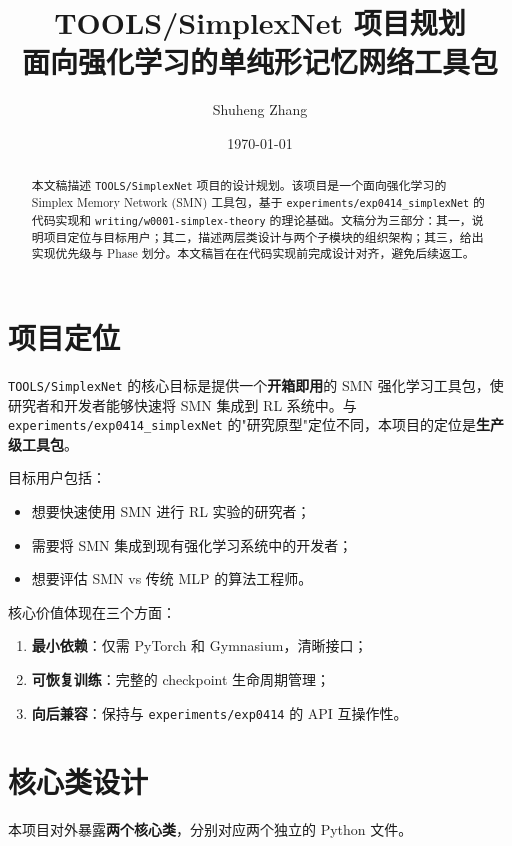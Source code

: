 \documentclass[11pt]{ctexart}
\title{TOOLS/SimplexNet 项目规划\\\large 面向强化学习的单纯形记忆网络工具包}
\author{Shuheng Zhang}
\date{\today}
\begin{document}
\maketitle

\begin{abstract}
本文稿描述 \texttt{TOOLS/SimplexNet} 项目的设计规划。该项目是一个面向强化学习的 Simplex Memory Network (SMN) 工具包，基于 \texttt{experiments/exp0414\_simplexNet} 的代码实现和 \texttt{writing/w0001-simplex-theory} 的理论基础。文稿分为三部分：其一，说明项目定位与目标用户；其二，描述两层类设计与两个子模块的组织架构；其三，给出实现优先级与 Phase 划分。本文稿旨在在代码实现前完成设计对齐，避免后续返工。
\end{abstract}

\tableofcontents

\section{项目定位}

\texttt{TOOLS/SimplexNet} 的核心目标是提供一个\textbf{开箱即用}的 SMN 强化学习工具包，使研究者和开发者能够快速将 SMN 集成到 RL 系统中。与 \texttt{experiments/exp0414\_simplexNet} 的"研究原型"定位不同，本项目的定位是\textbf{生产级工具包}。

目标用户包括：
\begin{itemize}[leftmargin=2em]
  \item 想要快速使用 SMN 进行 RL 实验的研究者；
  \item 需要将 SMN 集成到现有强化学习系统中的开发者；
  \item 想要评估 SMN vs 传统 MLP 的算法工程师。
\end{itemize}

核心价值体现在三个方面：
\begin{enumerate}[leftmargin=2em]
  \item \textbf{最小依赖}：仅需 PyTorch 和 Gymnasium，清晰接口；
  \item \textbf{可恢复训练}：完整的 checkpoint 生命周期管理；
  \item \textbf{向后兼容}：保持与 \texttt{experiments/exp0414} 的 API 互操作性。
\end{enumerate}

\section{核心类设计}

本项目对外暴露\textbf{两个核心类}，分别对应两个独立的 Python 文件。
\end{document}
